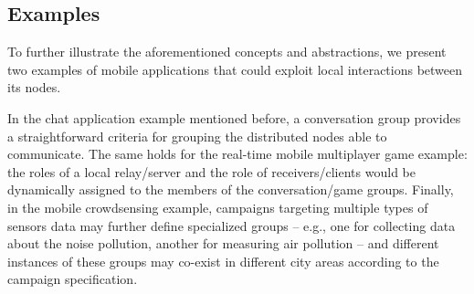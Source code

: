 
\subsection{Examples}

To further illustrate the aforementioned concepts and abstractions, we present two examples of mobile applications that could exploit local interactions between its nodes.

In the chat application example mentioned before, a conversation group provides a straightforward criteria for grouping the distributed nodes able to communicate. The same holds for the real-time mobile multiplayer game example: the roles of a local relay/server and the role of receivers/clients would be dynamically assigned to the members of the conversation/game groups. Finally, in the mobile crowdsensing example, campaigns targeting multiple types of sensors data may further define specialized groups -- e.g., one for collecting data about the noise pollution, another for measuring air pollution --  and different instances of these groups may co-exist in different city areas according to the campaign specification. 

